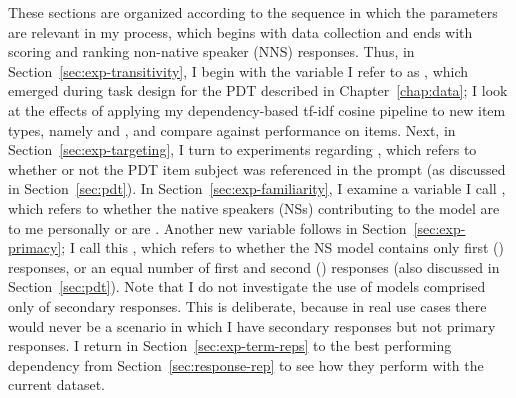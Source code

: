 These sections are organized according to the sequence in which the parameters are relevant in my process, which begins with data collection and ends with scoring and ranking non-native speaker (NNS) responses. Thus, in Section~\ref{sec:exp-transitivity}, I begin with the variable I refer to as , which emerged during task design for the PDT described in Chapter~\ref{chap:data}; I look at the effects of applying my dependency-based tf-idf cosine pipeline to new item types, namely  and , and compare against performance on  items. Next, in Section~\ref{sec:exp-targeting}, I turn to experiments regarding , which refers to whether or not the PDT item subject was referenced in the prompt (as discussed in Section~\ref{sec:pdt}). In Section~\ref{sec:exp-familiarity}, I examine a variable I call , which refers to whether the native speakers (NSs) contributing to the model are  to me personally or are . Another new variable follows in Section~\ref{sec:exp-primacy}; I call this , which refers to whether the NS model contains only first () responses, or an equal number of first and second () responses (also discussed in Section~\ref{sec:pdt}). Note that I do not investigate the use of models comprised only of secondary responses. This is deliberate, because in real use cases there would never be a scenario in which I have secondary responses but not primary responses. I return in Section~\ref{sec:exp-term-reps} to the best performing dependency  from Section~\ref{sec:response-rep} to see how they perform with the current dataset.



